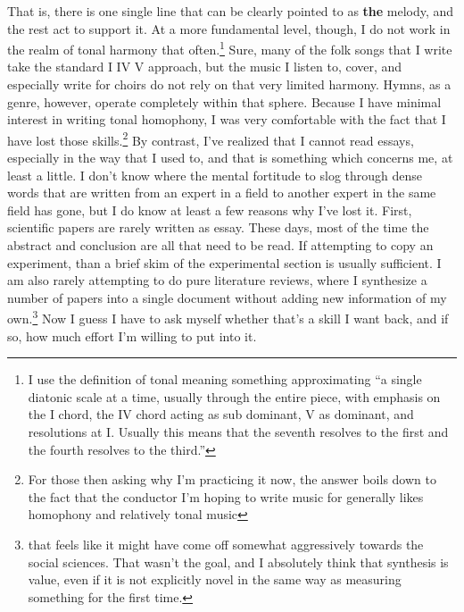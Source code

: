 \documentclass[12pt]{article}[titlepage]
\newcommand{\say}[1]{``#1''}
\renewcommand{\,}{\textsuperscript{,}}
\begin{document}
That is, there is one single line that can be clearly pointed to as \textbf{the} melody, and the rest act to support it.
At a more fundamental level, though, I do not work in the realm of tonal harmony that often.\footnote{I use the definition of tonal meaning something approximating \say{a single diatonic scale at a time, usually through the entire piece, with emphasis on the I chord, the IV chord acting as sub dominant, V as dominant, and resolutions at I. Usually this means that the seventh resolves to the first and the fourth resolves to the third.}}
Sure, many of the folk songs that I write take the standard I IV V approach, but the music I listen to, cover, and especially write for choirs do not rely on that very limited harmony.
Hymns, as a genre, however, operate completely within that sphere.
Because I have minimal interest in writing tonal homophony, I was very comfortable with the fact that I have lost those skills.\footnote{For those then asking why I'm practicing it now, the answer boils down to the fact that the conductor I'm hoping to write music for generally likes homophony and relatively tonal music}
By contrast, I've realized that I cannot read essays, especially in the way that I used to, and that is something which concerns me, at least a little.
I don't know where the mental fortitude to slog through dense words that are written from an expert in a field to another expert in the same field has gone, but I do know at least a few reasons why I've lost it.
First, scientific papers are rarely written as essay.
These days, most of the time the abstract and conclusion are all that need to be read.
If attempting to copy an experiment, than a brief skim of the experimental section is usually sufficient.
I am also rarely attempting to do pure literature reviews, where I synthesize a number of papers into a single document without adding new information of my own.\footnote{that feels like it might have come off somewhat aggressively towards the social sciences. That wasn't the goal, and I absolutely think that synthesis is value, even if it is not explicitly novel in the same way as measuring something for the first time.}
Now I guess I have to ask myself whether that's a skill I want back, and if so, how much effort I'm willing to put into it.
\end{document}
